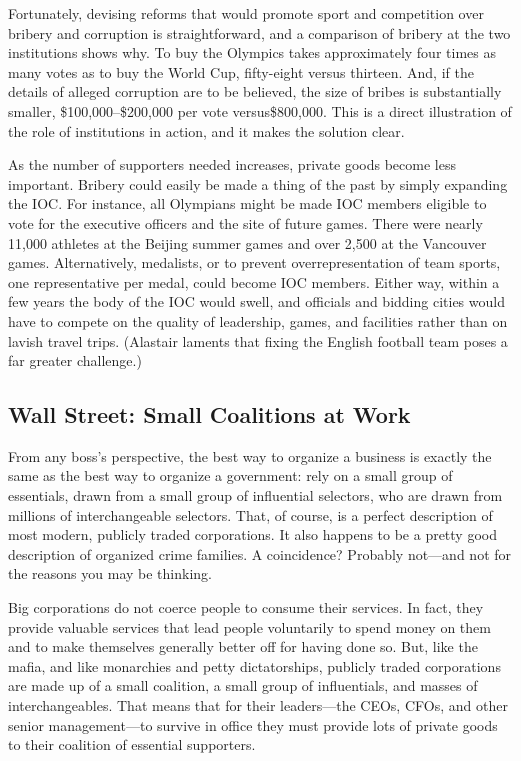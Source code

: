 \documentclass[10pt]{article}
\begin{document}
{\large Fortunately, devising reforms that would promote sport and competition
over bribery and corruption is straightforward, and a comparison of bribery at
the two institutions shows why. To buy the Olympics takes approximately four
times as many votes as to buy the World Cup, fifty-eight versus thirteen. And, if
the details of alleged corruption are to be believed, the size of bribes is
substantially smaller, \$100,000--\$200,000 per vote versus\$800,000. This is a
direct illustration of the role of institutions in action, and it makes the
solution clear.}

{\large As the number of supporters needed increases, private goods become less
important. Bribery could easily be made a thing of the past by simply expanding
the IOC. For instance, all Olympians might be made IOC members eligible to vote
for the executive officers and the site of future games. There were nearly 11,000
athletes at the Beijing summer games and over 2,500 at the Vancouver games.
Alternatively, medalists, or to prevent overrepresentation of team sports, one
representative per medal, could become IOC members. Either way, within a few
years the body of the IOC would swell, and officials and bidding cities would
have to compete on the quality of leadership, games, and facilities rather than
on lavish travel trips. (Alastair laments that fixing the English football team
poses a far greater challenge.)}

\subsection{Wall Street: Small Coalitions at Work}

{\large From any boss's perspective, the best way to organize a business is
exactly the same as the best way to organize a government: rely on a small group
of essentials, drawn from a small group of influential selectors, who are drawn
from millions of interchangeable selectors. That, of course, is a perfect
description of most modern, publicly traded corporations. It also happens to be a
pretty good description of organized crime families. A coincidence? Probably
not---and not for the reasons you may be thinking.}

{\large Big corporations do not coerce people to consume their services. In
fact, they provide valuable services that lead people voluntarily to spend money
on them and to make themselves generally better off for having done so. But, like
the mafia, and like monarchies and petty dictatorships, publicly traded
corporations are made up of a small coalition, a small group of influentials, and
masses of interchangeables. That means that for their leaders---the CEOs, CFOs,
and other senior management---to survive in office they must provide lots of
private goods to their coalition of essential supporters.}
\end{document}
